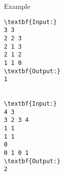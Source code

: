 Example
\begin{verbatim}
\textbf{Input:}
3 3
2 2 3
2 1 3
2 1 2
1 1 0
\textbf{Output:}
1


\textbf{Input:}
4 3
3 2 3 4
1 1
1 1
0
0 1 0 1
\textbf{Output:}
2

\end{verbatim}